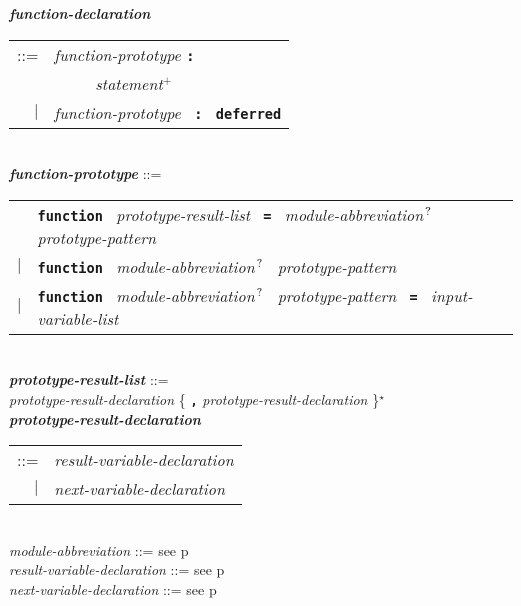 \documentclass[12pt]{article}
\newcommand{\TT}[1]{{\tt \bfseries #1}}
\newcommand{\STAR}{{\Large $^\star$}}
\newcommand{\PLUS}[1][]{{$^{+#1}$}}
\newcommand{\QMARK}{{$^{\,\mbox{\footnotesize ?}}$}}
\newcommand{\ttkey}[1]{{\tt \bfseries #1}}
\newcommand{\emkey}[1]{{\em \bfseries #1}}
\newcommand{\pagref}[1]{p\pageref{#1}}
\newenvironment{indpar}[1][0.3in]%
	{\begin{list}{}%
		     {\setlength{\itemsep}{0in}%
		      \setlength{\topsep}{0in}%
		      \setlength{\parsep}{1ex}%
		      \setlength{\labelwidth}{#1}%
		      \setlength{\leftmargin}{#1}%
		      \addtolength{\leftmargin}{\labelsep}}%
	 \item}%
	{\end{list}}
\begin{document}
\begin{indpar}
\emkey{function-declaration}\label{FUNCTION-DECLARATION}
    \begin{tabular}[t]{rl}
    ::= &  {\em function-prototype} \TT{:} \\
	& \TT{~~~~~}{\em statement}\PLUS{} \\
    $|$ &  {\em function-prototype}~ \TT{:}~ \ttkey{deferred} \\
    \end{tabular}
\\[2ex]
\emkey{function-prototype}\label{FUNCTION-PROTOTYPE} ::= \\
\hspace*{0.25in}
    \begin{tabular}[t]{@{}rl}
        & \ttkey{function}~
          {\em prototype-result-list}~ \TT{=}~
          {\em module-abbreviation}\QMARK{}~
	                {\em prototype-pattern} \\
    $|$ & \ttkey{function}~ {\em module-abbreviation}\QMARK{}~
                           {\em prototype-pattern} \\
    $|$ & \ttkey{function}~ {\em module-abbreviation}\QMARK{}~
                           {\em prototype-pattern}~ \TT{=}~
                           {\em input-variable-list} \\
    \end{tabular}
\\[0.5ex]
\emkey{prototype-result-list}\label{PROTOTYPE-RESULT-LIST} ::= \\
\hspace*{0.5in}
    {\em prototype-result-declaration}
    \{ \TT{,} {\em prototype-result-declaration} \}\STAR{}
\\[0.5ex]
\emkey{prototype-result-declaration}\label{PROTOTYPE-RESULT-DECLARATION} \\
\hspace*{1in}\begin{tabular}[t]{rl}
    ::= & {\em result-variable-declaration} \\
    $|$ & {\em next-variable-declaration} \\
    \end{tabular}
\\[0.5ex]
{\em module-abbreviation} ::= see \pagref{MODULE-ABBREVIATION}
\\[0.5ex]
{\em result-variable-declaration} ::= see \pagref{RESULT-VARIABLE-DECLARATION}
\\[0.5ex]
{\em next-variable-declaration} ::= see \pagref{NEXT-VARIABLE-DECLARATION}

\end{indpar}
\end{document}
